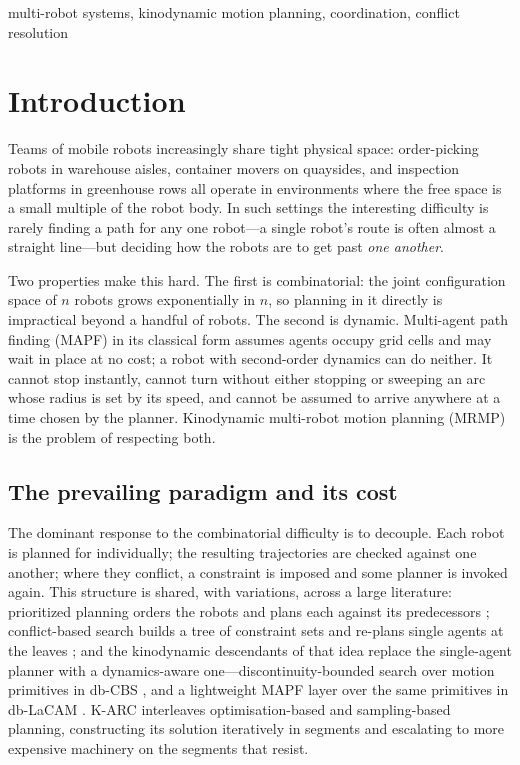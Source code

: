 \documentclass[conference]{IEEEtran}
\begin{document}
\begin{IEEEkeywords}
multi-robot systems, kinodynamic motion planning, coordination, conflict resolution
\end{IEEEkeywords}

\section{Introduction}

Teams of mobile robots increasingly share tight physical space: order-picking robots in
warehouse aisles, container movers on quaysides, and inspection platforms in greenhouse
rows all operate in environments where the free space is a small multiple of the robot
body. In such settings the interesting difficulty is rarely finding a path for any one
robot---a single robot's route is often almost a straight line---but deciding how the
robots are to get past \emph{one another}.

Two properties make this hard. The first is combinatorial: the joint configuration space
of $n$ robots grows exponentially in $n$, so planning in it directly is impractical beyond
a handful of robots. The second is dynamic. Multi-agent path finding (MAPF) in its
classical form \cite{cbs2015} assumes agents occupy grid cells and may wait in place at no
cost; a robot with second-order dynamics can do neither. It cannot stop instantly, cannot
turn without either stopping or sweeping an arc whose radius is set by its speed, and
cannot be assumed to arrive anywhere at a time chosen by the planner. Kinodynamic
multi-robot motion planning (MRMP) is the problem of respecting both.

\subsection{The prevailing paradigm and its cost}

The dominant response to the combinatorial difficulty is to decouple. Each robot is
planned for individually; the resulting trajectories are checked against one another;
where they conflict, a constraint is imposed and some planner is invoked again. This
structure is shared, with variations, across a large literature: prioritized planning
orders the robots and plans each against its predecessors \cite{erdmann1987}; conflict-based
search builds a tree of constraint sets and re-plans single agents at the leaves
\cite{cbs2015}; and the kinodynamic descendants of that idea replace the single-agent
planner with a dynamics-aware one---discontinuity-bounded search over motion primitives in
db-CBS \cite{dbcbs2024}, and a lightweight MAPF layer over the same primitives in
db-LaCAM \cite{dblacam2025}. K-ARC \cite{karc2025} interleaves optimisation-based and
sampling-based planning, constructing its solution iteratively in segments and escalating
to more expensive machinery on the segments that resist.
\end{document}
